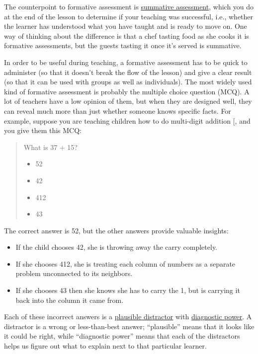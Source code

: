 The counterpoint to formative assessment is
\protect\hyperlink{g:summative-assessment}{summative assessment}, which you do
at the end of the lesson to determine if your teaching was successful,
i.e., whether the learner has understood what you have taught and is
ready to move on. One way of thinking about the difference is that a
chef tasting food as she cooks it is formative assessments, but the
guests tasting it once it's served is summative.

In order to be useful during teaching, a formative assessment has to be
quick to administer (so that it doesn't break the flow of the lesson)
and give a clear result (so that it can be used with groups as well as
individuals). The most widely used kind of formative assessment is
probably the multiple choice question (MCQ). A lot of teachers have a
low opinion of them, but when they are designed well, they can reveal
much more than just whether someone knows specific facts. For example,
suppose you are teaching children how to do multi-digit addition
{[}\protect[\hyperlink{b:Ojos2015}{Ojos2015}]{]}, and you give them this MCQ:

\begin{quote}\setlength{\parindent}{0pt}
What is 37 + 15?

\begin{itemize}
\tightlist
\item
  52
\item
  42
\item
  412
\item
  43
\end{itemize}
\end{quote}

The correct answer is 52, but the other answers provide valuable
insights:

\begin{itemize}
\item
  If the child chooses 42, she is throwing away the carry completely.
\item
  If she chooses 412, she is treating each column of numbers as a
  separate problem unconnected to its neighbors.
\item
  If she chooses 43 then she knows she has to carry the 1, but is
  carrying it back into the column it came from.
\end{itemize}

Each of these incorrect answers is a \protect\hyperlink{g:plausible-distractor}{plausible
distractor} with \protect\hyperlink{g:diagnostic-power}{diagnostic
power}. A distractor is a wrong or less-than-best
answer; ``plausible'' means that it looks like it could be right, while
``diagnostic power'' means that each of the distractors helps us figure
out what to explain next to that particular learner.

